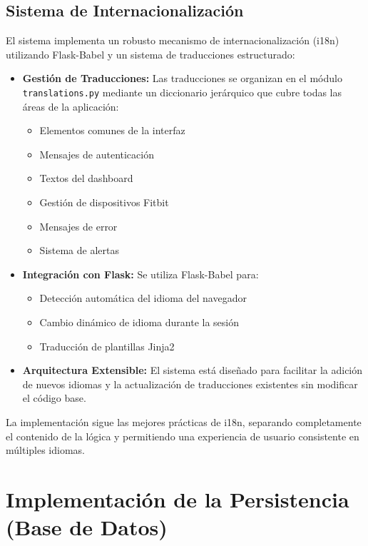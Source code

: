 \subsection{Sistema de Internacionalización}
\label{subsec:impl_i18n}

El sistema implementa un robusto mecanismo de internacionalización (i18n) utilizando Flask-Babel y un sistema de traducciones estructurado:

\begin{itemize}
    \item \textbf{Gestión de Traducciones:} Las traducciones se organizan en el módulo \texttt{translations.py} mediante un diccionario jerárquico que cubre todas las áreas de la aplicación:
        \begin{itemize}
            \item Elementos comunes de la interfaz
            \item Mensajes de autenticación
            \item Textos del dashboard
            \item Gestión de dispositivos Fitbit
            \item Mensajes de error
            \item Sistema de alertas
        \end{itemize}
    \item \textbf{Integración con Flask:} Se utiliza Flask-Babel para:
        \begin{itemize}
            \item Detección automática del idioma del navegador
            \item Cambio dinámico de idioma durante la sesión
            \item Traducción de plantillas Jinja2
        \end{itemize}
    \item \textbf{Arquitectura Extensible:} El sistema está diseñado para facilitar la adición de nuevos idiomas y la actualización de traducciones existentes sin modificar el código base.
\end{itemize}

La implementación sigue las mejores prácticas de i18n, separando completamente el contenido de la lógica y permitiendo una experiencia de usuario consistente en múltiples idiomas.

\section{Implementación de la Persistencia (Base de Datos)}
\label{sec:impl_persistencia}

